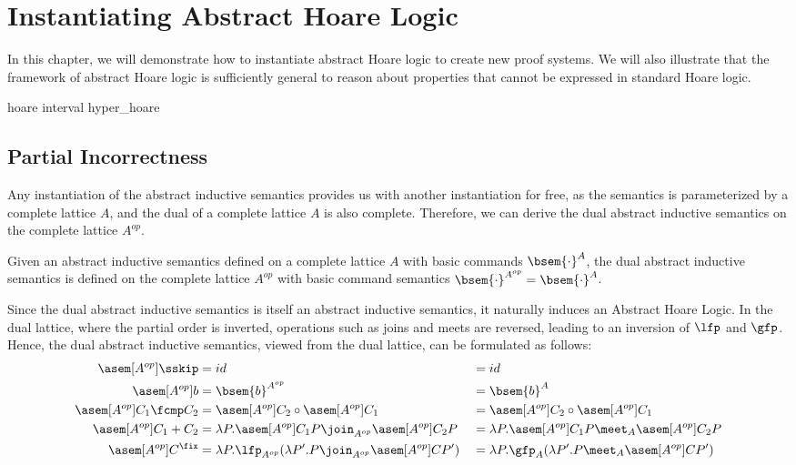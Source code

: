 \chapter{Instantiating Abstract Hoare Logic}

In this chapter, we will demonstrate how to instantiate abstract Hoare logic to
create new proof systems. We will also illustrate that the framework of
abstract Hoare logic is sufficiently general to reason about properties that
cannot be expressed in standard Hoare logic.

{hoare}
{interval}
{hyper_hoare}

\section{Partial Incorrectness}
\label{chp:partial-incorrectness}

Any instantiation of the abstract inductive semantics provides us with another
instantiation for free, as the semantics is parameterized by a complete lattice
\( A \), and the dual of a complete lattice \( A \) is also complete. Therefore,
we can derive the dual abstract inductive semantics on the complete lattice
\( A^{op} \).

\begin{definition}
  Given an abstract inductive semantics defined on a complete lattice \( A \)
  with basic commands \( \bsem{\cdot}^A \), the dual abstract inductive
  semantics is defined on the complete lattice \( A^{op} \) with basic command
  semantics \( \bsem{\cdot}^{A^{op}} = \bsem{\cdot}^A \).
\end{definition}

Since the dual abstract inductive semantics is itself an abstract inductive
semantics, it naturally induces an Abstract Hoare Logic. In the dual lattice,
where the partial order is inverted, operations such as joins and meets are
reversed, leading to an inversion of \( \lfp \) and \( \gfp \). Hence, the dual
abstract inductive semantics, viewed from the dual lattice, can be formulated
as follows:
\begin{align*}
  \asem[A^{op}]{\sskip}        &= id &&= id \\
  \asem[A^{op}]{b}             &= \bsem{b}^{A^{op}} &&= \bsem{b}^A \\
  \asem[A^{op}]{C_1 \fcmp C_2} &= \asem[A^{op}]{C_2} \circ \asem[A^{op}]{C_1} &&= \asem[A^{op}]{C_2} \circ \asem[A^{op}]{C_1} \\
  \asem[A^{op}]{C_1 + C_2}     &= \lambda P . \asem[A^{op}]{C_1} P \join_{A^{op}} \asem[A^{op}]{C_2} P &&= \lambda P . \asem[A^{op}]{C_1} P \meet_A \asem[A^{op}]{C_2} P \\
  \asem[A^{op}]{C^\fix}        &= \lambda P . \lfp_{A^{op}}(\lambda P'. P \join_{A^{op}} \asem[A^{op}]{C} P') &&= \lambda P . \gfp_{A}(\lambda P'. P \meet_A \asem[A^{op}]{C} P')
\end{align*}

